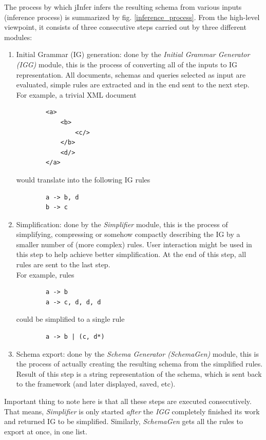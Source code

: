 \documentclass[a4paper,10pt,oneside]{article}
\begin{document}
The process by which jInfer infers the resulting schema from various inputs (inference process) is summarized by fig. \ref{inference_process}. From the high-level viewpoint, it consists of three consecutive steps carried out by three different modules:
\begin{enumerate}
	\item Initial Grammar (IG) generation: done by the \textit{Initial Grammar Generator (IGG)} module, this is the process of converting all of the inputs to IG representation. All documents, schemas and queries selected as input are evaluated, simple rules are extracted and in the end sent to the next step.\\
	For example, a trivial XML document
	\begin{verbatim}
		<a>
			<b>
				<c/>
			</b>
			<d/>
		</a>
	\end{verbatim}
	would translate into the following IG rules
	\begin{verbatim}
		a -> b, d
		b -> c
	\end{verbatim}	
	\item Simplification: done by the \textit{Simplifier} module, this is the process of simplifying, compressing or somehow compactly describing the IG by a smaller number of (more complex) rules. User interaction might be used in this step to help achieve better simplification. At the end of this step, all rules are sent to the last step.\\
	For example, rules
	\begin{verbatim}
		a -> b
		a -> c, d, d, d
	\end{verbatim}
	could be simplified to a single rule
	\begin{verbatim}
		a -> b | (c, d*)
	\end{verbatim}
	\item Schema export: done by the \textit{Schema Generator (SchemaGen)} module, this is the process of actually creating the resulting schema from the simplified rules. Result of this step is a string representation of the schema, which is sent back to the framework (and later displayed, saved, etc).\\
\end{enumerate}
Important thing to note here is that all these steps are executed consecutively. That means, \textit{Simplifier} is only started \textit{after} the \textit{IGG} completely finished its work and returned IG to be simplified. Similarly, \textit{SchemaGen} gets all the rules to export at once, in one list.\\
\end{document}

